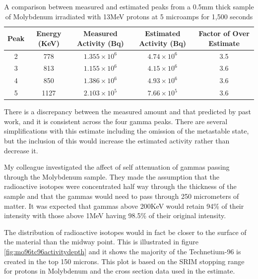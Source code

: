 \begin{table}[h]
\begin{center}
\begin{tabular}{c c c c c}
\hline\hline
Peak & Energy (KeV) & Measured Activity (Bq) & Estimated Activity (Bq) & Factor of Over Estimate\\
\hline\hline
2 & 778 & $1.355 \times 10^{6}$ & $4.74 \times 10^{6}$ & 3.5\\
3 & 813 & $1.155 \times 10^{6}$ & $4.15 \times 10^{6}$ & 3.6\\
4 & 850 & $1.386 \times 10^{6}$ & $4.93 \times 10^{6}$ & 3.6 \\
5 & 1127 & $2.103 \times 10^{5}$ & $7.66 \times 10^{5}$ & 3.6 \\
\hline\hline
\end{tabular}
\end{center}
\caption{A comparison between measured and estimated peaks from a 0.5mm thick sample of Molybdenum irradiated with 13MeV protons at 5 microamps for 1,500 seconds}
\label{table:johnhewettresultsvestimate}
\end{table}

There is a discrepancy between the measured amount and that predicted by past work, and it is consistent across the four gamma peaks.  There are several simplifications with this estimate including the omission of the metastable state, but the inclusion of this would increase the estimated activity rather than decrease it.

My colleague investigated the affect of self attenuation of gammas passing through the Molybdenum sample.  They made the assumption that the radioactive isotopes were concentrated half way through the thickness of the sample and that the gammas would need to pass through 250 micrometers of matter.  It was expected that gammas above 200KeV would retain 94\% of their intensity with those above 1MeV having 98.5\% of their original intensity\cite{johnhewett}.

The distribution of radioactive isotopes would in fact be closer to the surface of the material than the midway point.  This is illustrated in figure \ref{fig:mo96tc96activitydepth} and it shows the majority of the Technetium-96 is created in the top 150 microns.  This plot is based on the SRIM stopping range for protons in Molybdenum and the cross section data used in the estimate.

